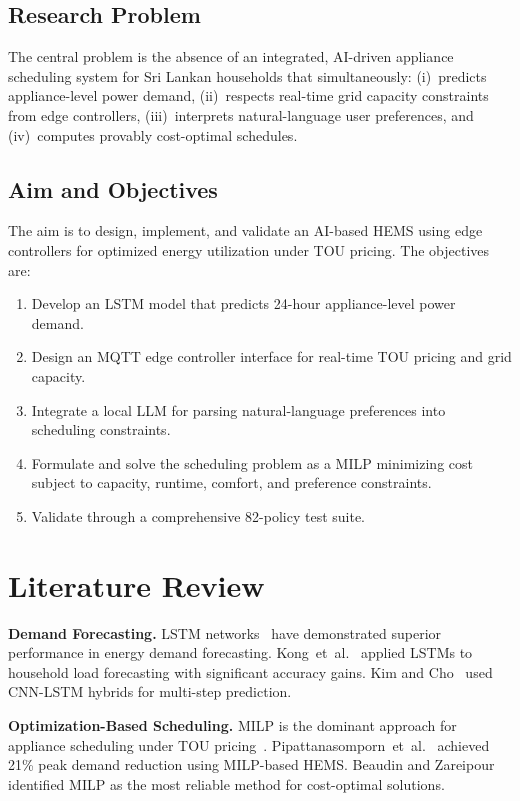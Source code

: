 \documentclass[10pt,a4paper,twocolumn]{article}
\begin{document}
\subsection{Research Problem}
The central problem is the absence of an integrated, AI-driven appliance scheduling system for Sri Lankan households that simultaneously: (i)~predicts appliance-level power demand, (ii)~respects real-time grid capacity constraints from edge controllers, (iii)~interprets natural-language user preferences, and (iv)~computes provably cost-optimal schedules.

\subsection{Aim and Objectives}
The aim is to design, implement, and validate an AI-based HEMS using edge controllers for optimized energy utilization under TOU pricing. The objectives are:
\begin{enumerate}[label=(\roman*)]
    \item Develop an LSTM model that predicts 24-hour appliance-level power demand.
    \item Design an MQTT edge controller interface for real-time TOU pricing and grid capacity.
    \item Integrate a local LLM for parsing natural-language preferences into scheduling constraints.
    \item Formulate and solve the scheduling problem as a MILP minimizing cost subject to capacity, runtime, comfort, and preference constraints.
    \item Validate through a comprehensive 82-policy test suite.
\end{enumerate}

\section{Literature Review}

\textbf{Demand Forecasting.} LSTM networks~\cite{hochreiter1997} have demonstrated superior performance in energy demand forecasting. Kong~et~al.~\cite{kong2019} applied LSTMs to household load forecasting with significant accuracy gains. Kim and Cho~\cite{kim2019} used CNN-LSTM hybrids for multi-step prediction.

\textbf{Optimization-Based Scheduling.} MILP is the dominant approach for appliance scheduling under TOU pricing~\cite{garifi2018}. Pipattanasomporn~et~al.~\cite{pipattanasomporn2012} achieved 21\% peak demand reduction using MILP-based HEMS. Beaudin and Zareipour~\cite{beaudin2015} identified MILP as the most reliable method for cost-optimal solutions.
\end{document}
